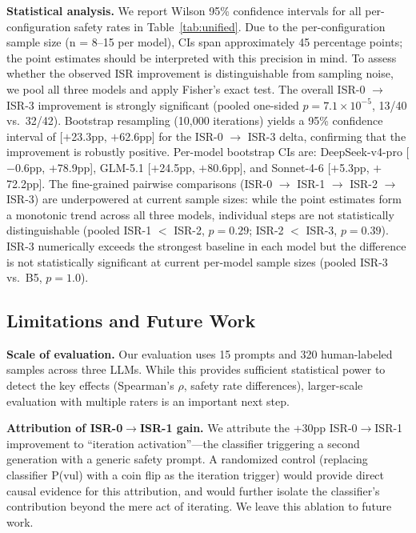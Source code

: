 \documentclass[10pt,conference]{IEEEtran}
\begin{document}
\textbf{Statistical analysis.}
We report Wilson 95\% confidence intervals for all per-configuration safety rates in Table~\ref{tab:unified}. Due to the per-configuration sample size (n = 8--15 per model), CIs span approximately 45 percentage points; the point estimates should be interpreted with this precision in mind. To assess whether the observed ISR improvement is distinguishable from sampling noise, we pool all three models and apply Fisher's exact test. The overall ISR-0 $\rightarrow$ ISR-3 improvement is strongly significant (pooled one-sided $p = 7.1 \times 10^{-5}$, 13/40 vs.\ 32/42). Bootstrap resampling (10,000 iterations) yields a 95\% confidence interval of [$+$23.3pp, $+$62.6pp] for the ISR-0 $\rightarrow$ ISR-3 delta, confirming that the improvement is robustly positive. Per-model bootstrap CIs are: DeepSeek-v4-pro [$-$0.6pp, $+$78.9pp], GLM-5.1 [$+$24.5pp, $+$80.6pp], and Sonnet-4-6 [$+$5.3pp, $+$72.2pp]. The fine-grained pairwise comparisons (ISR-0 $\rightarrow$ ISR-1 $\rightarrow$ ISR-2 $\rightarrow$ ISR-3) are underpowered at current sample sizes: while the point estimates form a monotonic trend across all three models, individual steps are not statistically distinguishable (pooled ISR-1 $<$ ISR-2, $p = 0.29$; ISR-2 $<$ ISR-3, $p = 0.39$). ISR-3 numerically exceeds the strongest baseline in each model but the difference is not statistically significant at current per-model sample sizes (pooled ISR-3 vs.\ B5, $p = 1.0$).

\subsection{Limitations and Future Work}

\textbf{Scale of evaluation.} Our evaluation uses 15 prompts and 320 human-labeled samples across three LLMs. While this provides sufficient statistical power to detect the key effects (Spearman's $\rho$, safety rate differences), larger-scale evaluation with multiple raters is an important next step.

\textbf{Attribution of ISR-0$\rightarrow$ISR-1 gain.} We attribute the +30pp ISR-0$\rightarrow$ISR-1 improvement to ``iteration activation''---the classifier triggering a second generation with a generic safety prompt. A randomized control (replacing classifier P(vul) with a coin flip as the iteration trigger) would provide direct causal evidence for this attribution, and would further isolate the classifier's contribution beyond the mere act of iterating. We leave this ablation to future work.
\end{document}
